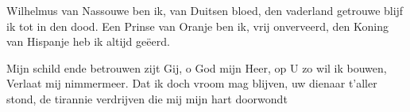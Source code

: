\begin{verse*}
Wilhelmus van Nassouwe
ben ik, van Duitsen bloed,
den vaderland getrouwe
blijf ik tot in den dood.
Een Prinse van Oranje
ben ik, vrij onverveerd,
den Koning van Hispanje
heb ik altijd geëerd.
\end{verse*}

\begin{verse*}
Mijn schild ende betrouwen
zijt Gij, o God mijn Heer,
op U zo wil ik bouwen,
Verlaat mij nimmermeer.
Dat ik doch vroom mag blijven,
uw dienaar t'aller stond,
de tirannie verdrijven
die mij mijn hart doorwondt
\end{verse*}
